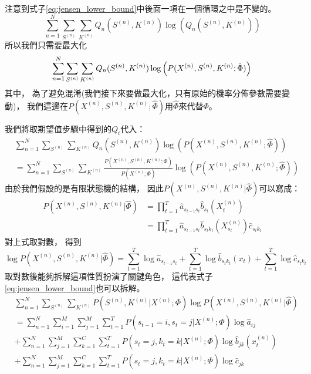     注意到式子\ref{eq:jensen_lower_bound}中後面一項在一個循環之中是不變的。
    \begin{equation}
      \sum_{n=1}^N \sum_{S^{(n)}} \sum_{K^{(n)}} Q_n(S^{(n)}, K^{(n)}) \log \left( Q_n(S^{(n)}, K^{(n)}) \right) 
    \end{equation}
    所以我們只需要最大化
    \begin{equation}
      \sum_{n=1}^N \sum_{S^{(n)}} \sum_{K^{(n)}} Q_n(S^{(n)}, K^{(n)}) \log \left( P(X^{(n)}, S^{(n)}, K^{(n)}; \hat{\Phi}) \right) \\ 
    \end{equation}
    其中，
    為了避免混淆(我們接下來要做最大化，只有原始的機率分佈參數需要變動)，
    我們這邊在$P(X^{(n)}, S^{(n)}, K^{(n)}; \hat{\Phi})$用$\hat{\Phi}$來代替$\Phi$。

    我們將取期望值步驟中得到的$Q_i$代入：
    \begin{equation}
      \begin{split}
	&\sum_{n=1}^N \sum_{S^{(n)}} \sum_{K^{(n)}} Q_n(S^{(n)}, K^{(n)}) \log \left( P(X^{(n)}, S^{(n)}, K^{(n)}; \hat{\Phi}) \right) \\
	&= \sum_{n=1}^N \sum_{S^{(n)}} \sum_{K^{(n)}} \frac{P(X^{(n)}, S^{(n)}, K^{(n)}; \Phi)}{P(X^{(n)}; \Phi)} \log \left( P(X^{(n)}, S^{(n)}, K^{(n)}; \hat{\Phi}) \right) 
      \end{split}
    \end{equation}
    由於我們假設的是有限狀態機的結構，
    因此$P(X^{(n)}, S^{(n)}, K^{(n)} | \hat{\Phi})$可以寫成：
    \begin{equation}
      \begin{split}
	P(X^{(n)}, S^{(n)}, K^{(n)} | \hat{\Phi}) 
	&= \prod_{t=1}^T \hat{a}_{s_{t-1} s_t} \hat{b}_{s_t} (X^{(n)}_{t})\\
	&= \prod_{t=1}^T \hat{a}_{s_{t-1} s_t} \hat{b}_{s_t k_t} (X^{(n)}_{s_t}) \hat{c}_{s_t k_t} 
      \end{split}
    \end{equation}
    對上式取對數，
    得到
    \begin{equation}
     \log P(X^{(n)}, S^{(n)}, K^{(n)} | \hat{\Phi}) = \sum_{t=1}^T \log \hat{a}_{s_{t-1} s_t} + \sum_{t=1}^T \log \hat{b}_{s_t k_t} (x_t) + \sum_{t=1}^T \log \hat{c}_{s_t k_t}
    \end{equation}
    取對數後能夠拆解這項性質扮演了關鍵角色，
    這代表式子\ref{eq:jensen_lower_bound}也可以拆解。
    \begin{equation}
      \begin{split}
	&\sum_{n=1}^N \sum_{S^{(n)}} \sum_{K^{(n)}} P(S^{(n)}, K^{(n)} | X^{(n)}; \Phi) \log P(X^{(n)}, S^{(n)}, K^{(n)} | \hat{\Phi}) \\
	&= \sum_{n=1}^N \sum_{i=1}^{M} \sum_{j=1}^{M} \sum_{t=1}^T P(s_{t-1} = i, s_t = j | X^{(n)}; \Phi) \log \hat{a}_{ij} \\
	&+ \sum_{n=1}^N \sum_{j=1}^M \sum_{k=1}^C \sum_{t=1}^T P(s_t = j, k_t = k | X^{(n)}; \Phi) \log \hat{b}_{jk} (x^{(n)}_t) \\
	&+ \sum_{n=1}^N \sum_{j=1}^M \sum_{k=1}^C \sum_{t=1}^T P(s_t = j, k_t = k | X^{(n)}; \Phi) \log \hat{c}_{jk} \\
      \end{split}
    \end{equation}
